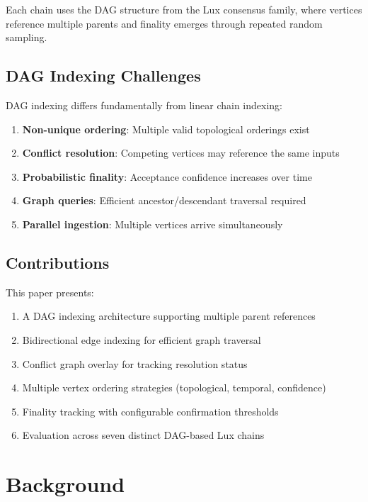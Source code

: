 \documentclass[11pt,twocolumn]{article}
\begin{document}
Each chain uses the DAG structure from the Lux consensus family, where vertices reference multiple parents and finality emerges through repeated random sampling.

\subsection{DAG Indexing Challenges}

DAG indexing differs fundamentally from linear chain indexing:

\begin{enumerate}
\item \textbf{Non-unique ordering}: Multiple valid topological orderings exist
\item \textbf{Conflict resolution}: Competing vertices may reference the same inputs
\item \textbf{Probabilistic finality}: Acceptance confidence increases over time
\item \textbf{Graph queries}: Efficient ancestor/descendant traversal required
\item \textbf{Parallel ingestion}: Multiple vertices arrive simultaneously
\end{enumerate}

\subsection{Contributions}

This paper presents:

\begin{enumerate}
\item A DAG indexing architecture supporting multiple parent references
\item Bidirectional edge indexing for efficient graph traversal
\item Conflict graph overlay for tracking resolution status
\item Multiple vertex ordering strategies (topological, temporal, confidence)
\item Finality tracking with configurable confirmation thresholds
\item Evaluation across seven distinct DAG-based Lux chains
\end{enumerate}

\section{Background}
\end{document}
